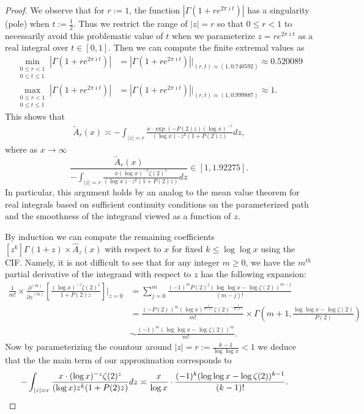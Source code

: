 \documentclass[11pt,reqno,a4letter]{article}
\numberwithin{figure}{section}
\numberwithin{table}{section}
\theoremstyle{plain}
\numberwithin{theorem}{section}
\theoremstyle{definition}
\begin{document}
\begin{proof}
We observe that for $r := 1$, the function $|\Gamma(1+re^{2\pi\imath t})|$ has a 
singularity (pole) when $t := \frac{1}{2}$. Thus we restrict the range of $|z| = r$ 
so that $0 \leq r < 1$ to necessarily avoid this problematic value of $t$ when 
we parameterize $z = r e^{2\pi\imath t}$ as a real integral over $t \in [0, 1]$. 
Then we can compute the finite extremal values as 
\begin{align*} 
\min\limits_{\substack{0 \leq r < 1 \\ 0 \leq t \leq 1}} |\Gamma(1+re^{2\pi\imath t})| & = 
     |\Gamma(1+re^{2\pi\imath t})| \Biggr\rvert_{(r,t) \approx (1, 0.740592)} \approx 
     0.520089 \\ 
\max\limits_{\substack{0 \leq r < 1 \\ 0 \leq t \leq 1}} |\Gamma(1+re^{2\pi\imath t})| & = 
     |\Gamma(1+re^{2\pi\imath t})| \Biggr\rvert_{(r,t) \approx (1, 0.999887)} \approx 1. 
\end{align*} 
This shows that 
\begin{align} 
\label{eqn_WideTildeArx_CountourIntDef_v2} 
\widetilde{A}_r(x) \asymp 
     -\int_{|z|=r} \frac{x \cdot \exp(-P(2) z) (\log x)^{-z}}{(\log x) \cdot 
     z^{k} (1 + P(2) z)} dz, 
\end{align} 
where as $x \rightarrow \infty$ 
\[
\frac{\widetilde{A}_r(x)}{-\int_{|z|=r} \frac{x (\log x)^{-z} \zeta(2)^{z}}{(\log x) \cdot 
     z^{k} (1 + P(2) z)} dz} \in [1, 1.92275]. 
\] 
In particular, this argument holds by an analog to the mean value theorem for real integrals 
based on sufficient continuity conditions on the parameterized path and the 
smoothness of the integrand viewed as a function of $z$.  

By induction we can compute the remaining coefficients 
$[z^k] \Gamma(1+z) \times \widehat{A}_z(x)$ with respect to 
$x$ for fixed $k \leq \log\log x$ using the CIF. 
Namely, it is not difficult to see that for any integer $m \geq 0$, 
we have the $m^{th}$ partial derivative of the integrand with respect to $z$ 
has the following expansion: 
\begin{align*} 
\frac{1}{m!} \times \frac{\partial^{(m)}}{{\partial z}^{(m)}}\left[ 
     \frac{(\log x)^{-z} \zeta(2)^{z}}{1 + P(2) z}\right] \Biggr\rvert_{z=0} & = 
     \sum_{j=0}^{m} \frac{(-1)^{m} P(2)^{j} (\log\log x - \log\zeta(2))^{m-j}}{(m-j)!} \\ 
     & = 
     \frac{(-P(2))^{m} (\log x)^{\frac{1}{P(2)}} \zeta(2)^{-\frac{1}{P(2)}}}{m!} \times 
     \Gamma\left(m+1, \frac{\log\log x - \log\zeta(2)}{P(2)}\right) \\ 
     & \sim \frac{(-1)^m (\log\log x -\log\zeta(2))^{m}}{m!}. 
\end{align*} 
Now by parameterizing the countour around $|z| = r := \frac{k-1}{\log\log x} < 1$ we 
deduce that the the main term of our approximation corresponds to 
\begin{align*} 
-\int_{|z|=r} \frac{x \cdot (\log x)^{-z} \zeta(2)^{z}}{(\log x) z^{k} (1 + P(2) z)} dz & \asymp 
     \frac{x}{\log x} \cdot \frac{(-1)^{k} (\log\log x - \log\zeta(2))^{k-1}}{(k-1)!}. 
     \qedhere 
\end{align*} 
\end{proof} 
\end{document}

